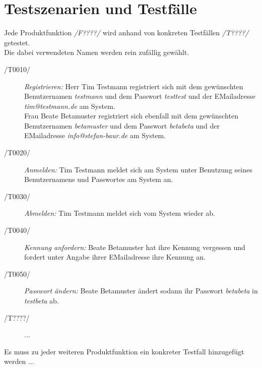 \section{Testszenarien und Testfälle}


Jede Produktfunktion \textit{/F????/} wird anhand von konkreten Testfällen \textit{/T????/} getestet.\\
Die dabei verwendeten Namen werden rein zufällig gewählt.

\begin{description}
  \item[/T0010/]
    \textit{Registrieren:}
    Herr Tim Testmann registriert sich mit dem gewünschten Benutzernamen \textit{testmann}
    und dem Passwort \textit{testtest} und der EMailadresse \textit{tim@testmann.de} am System.\\
    Frau Beate Betamuster registriert sich ebenfall mit dem gewünschten Benutzernamen \textit{betamuster}
    und dem Passwort \textit{betabeta} und der EMailadresse \textit{info@stefan-baur.de} am System.
  \item[/T0020/]
    \textit{Anmelden:}
    Tim Testmann meldet sich am System unter Benutzung seines Benutzernamens und Passwortes am System an.
  \item[/T0030/]
    \textit{Abmelden:}
    Tim Testmann meldet sich vom System wieder ab.
  \item[/T0040/]
    \textit{Kennung anfordern:}
    Beate Betamuster hat ihre Kennung vergessen und fordert unter Angabe ihrer EMailadresse ihre Kennung an.
  \item[/T0050/]
    \textit{Passwort ändern:}
    Beate Betamuster ändert sodann ihr Passwort \textit{betabeta} in \textit{testbeta} ab.
  \item[/T????/]
    ...
\end{description}

\textcolor{warning}{Es muss zu jeder weiteren Produktfunktion ein konkreter Testfall hinzugefügt werden ...}
